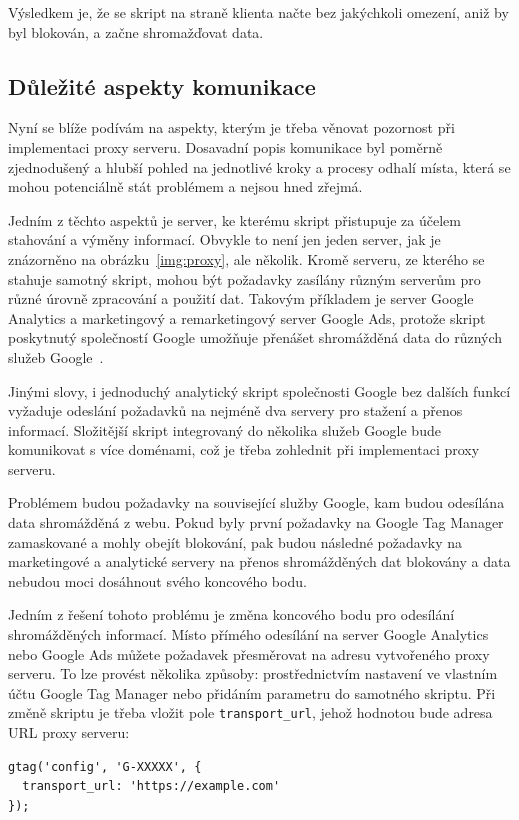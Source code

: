 Výsledkem je, že se skript na straně klienta načte bez jakýchkoli omezení, aniž by byl blokován, a začne shromažďovat data.


\subsection*{Důležité aspekty komunikace}
\label{sub:4:aspekty}

Nyní se blíže podívám na aspekty, kterým je třeba věnovat pozornost při implementaci proxy serveru. Dosavadní popis komunikace byl poměrně zjednodušený a hlubší pohled na jednotlivé kroky a procesy odhalí místa, která se mohou potenciálně stát problémem a nejsou hned zřejmá. 

Jedním z těchto aspektů je server, ke kterému skript přistupuje za účelem stahování a výměny informací. Obvykle to není jen jeden server, jak je znázorněno na obrázku~\ref{img:proxy}, ale několik. Kromě serveru, ze kterého se stahuje samotný skript, mohou být požadavky zasílány různým serverům pro různé úrovně zpracování a použití dat. Takovým příkladem je server Google Analytics a marketingový a remarketingový server Google Ads, protože skript poskytnutý společností Google umožňuje přenášet shromážděná data do různých služeb Google~\cite{webSiteTag}.

Jinými slovy, i jednoduchý analytický skript společnosti Google bez dalších funkcí vyžaduje odeslání požadavků na nejméně dva servery pro stažení a přenos informací. Složitější skript integrovaný do několika služeb Google bude komunikovat s více doménami, což je třeba zohlednit při implementaci proxy serveru.

Problémem budou požadavky na související služby Google, kam budou odesílána data shromážděná z webu. Pokud byly první požadavky na Google Tag Manager zamaskované a mohly obejít blokování, pak budou následné požadavky na marketingové a analytické servery na přenos shromážděných dat blokovány a data nebudou moci dosáhnout svého koncového bodu. 

Jedním z řešení tohoto problému je změna koncového bodu pro odesílání shromážděných informací. Místo přímého odesílání na server Google Analytics nebo Google Ads můžete požadavek přesměrovat na adresu vytvořeného proxy serveru. To lze provést několika způsoby: prostřednictvím nastavení ve vlastním účtu Google Tag Manager nebo přidáním parametru do samotného skriptu. Při změně skriptu je třeba vložit pole \texttt{transport\_url}, jehož hodnotou bude adresa URL proxy serveru:
\begin{lstlisting}[caption=Skript pro změnu cílového serveru, label=transport-url]
gtag('config', 'G-XXXXX', {
  transport_url: 'https://example.com'
});
\end{lstlisting}

